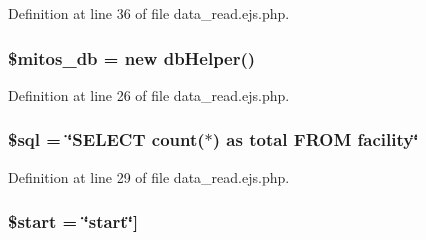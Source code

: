 \-Definition at line 36 of file data\-\_\-read.\-ejs.\-php.

\hypertarget{patientfile_2immnunization_2data__read_8ejs_8php_ab5d961f93efe4e2e8d8374f01dd6c65a}{
\subsubsection[{\$mitos\-\_\-db}]{\setlength{\rightskip}{0pt plus 5cm}\$mitos\-\_\-db = new {\bf db\-Helper}()}}\label{patientfile_2immnunization_2data__read_8ejs_8php_ab5d961f93efe4e2e8d8374f01dd6c65a}


\-Definition at line 26 of file data\-\_\-read.\-ejs.\-php.

\hypertarget{patientfile_2immnunization_2data__read_8ejs_8php_a047170d6020a882807665812a27e2525}{
\subsubsection[{\$sql}]{\setlength{\rightskip}{0pt plus 5cm}\$sql = \char`\"{}\-S\-E\-L\-E\-C\-T count($\ast$) as total \-F\-R\-O\-M facility\char`\"{}}}\label{patientfile_2immnunization_2data__read_8ejs_8php_a047170d6020a882807665812a27e2525}


\-Definition at line 29 of file data\-\_\-read.\-ejs.\-php.

\hypertarget{patientfile_2immnunization_2data__read_8ejs_8php_a50a00e7de77365e00b117e73aa82fb9b}{
\subsubsection[{\$start}]{\setlength{\rightskip}{0pt plus 5cm}\$start = \char`\"{}start\char`\"{}\mbox{]}}}\label{patientfile_2immnunization_2data__read_8ejs_8php_a50a00e7de77365e00b117e73aa82fb9b}


